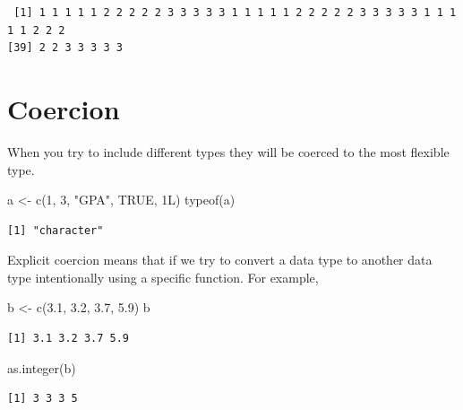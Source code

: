 \documentclass[
  letterpaper,
  DIV=11,
  numbers=noendperiod]{scrreprt}
\newenvironment{Shaded}{\begin{snugshade}}{\end{snugshade}}
\newcommand{\ConstantTok}[1]{\textcolor[rgb]{0.56,0.35,0.01}{#1}}
\newcommand{\DecValTok}[1]{\textcolor[rgb]{0.68,0.00,0.00}{#1}}
\newcommand{\FloatTok}[1]{\textcolor[rgb]{0.68,0.00,0.00}{#1}}
\newcommand{\FunctionTok}[1]{\textcolor[rgb]{0.28,0.35,0.67}{#1}}
\newcommand{\NormalTok}[1]{\textcolor[rgb]{0.00,0.23,0.31}{#1}}
\newcommand{\OtherTok}[1]{\textcolor[rgb]{0.00,0.23,0.31}{#1}}
\newcommand{\StringTok}[1]{\textcolor[rgb]{0.13,0.47,0.30}{#1}}
\begin{document}
\begin{verbatim}
 [1] 1 1 1 1 1 2 2 2 2 2 3 3 3 3 3 1 1 1 1 1 2 2 2 2 2 3 3 3 3 3 1 1 1 1 1 2 2 2
[39] 2 2 3 3 3 3 3
\end{verbatim}

\hypertarget{coercion}{%
\section{Coercion}\label{coercion}}

When you try to include different types they will be coerced to the most
flexible type.

\begin{Shaded}
\begin{Highlighting}[]
\NormalTok{a }\OtherTok{\textless{}{-}} \FunctionTok{c}\NormalTok{(}\DecValTok{1}\NormalTok{, }\DecValTok{3}\NormalTok{, }\StringTok{"GPA"}\NormalTok{, }\ConstantTok{TRUE}\NormalTok{, 1L)}
\FunctionTok{typeof}\NormalTok{(a)}
\end{Highlighting}
\end{Shaded}

\begin{verbatim}
[1] "character"
\end{verbatim}

Explicit coercion means that if we try to convert a data type to another
data type intentionally using a specific function. For example,

\begin{Shaded}
\begin{Highlighting}[]
\NormalTok{b }\OtherTok{\textless{}{-}} \FunctionTok{c}\NormalTok{(}\FloatTok{3.1}\NormalTok{, }\FloatTok{3.2}\NormalTok{, }\FloatTok{3.7}\NormalTok{, }\FloatTok{5.9}\NormalTok{)}
\NormalTok{b}
\end{Highlighting}
\end{Shaded}

\begin{verbatim}
[1] 3.1 3.2 3.7 5.9
\end{verbatim}

\begin{Shaded}
\begin{Highlighting}[]
\FunctionTok{as.integer}\NormalTok{(b)}
\end{Highlighting}
\end{Shaded}

\begin{verbatim}
[1] 3 3 3 5
\end{verbatim}
\end{document}
